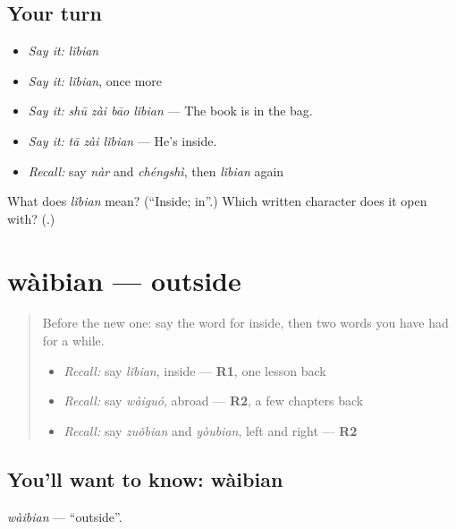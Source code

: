 \subsection*{Your turn}
\begin{itemize}
\raggedright
  \item \emph{Say it:} \emph{lǐbian}
  \item \emph{Say it:} \emph{lǐbian}, once more
  \item \emph{Say it:} \emph{shū zài bāo lǐbian} — The book is in the bag.
  \item \emph{Say it:} \emph{tā zài lǐbian} — He's inside.
  \item \emph{Recall:} say \emph{nàr} and \emph{chéngshì}, then \emph{lǐbian} again
\end{itemize}

\begin{tcolorbox}[breakable,colback=teal!4,colframe=teal!35!black,title={Before you move on}]
What does \emph{lǐbian} mean? (\textquotedblleft{}Inside; in\textquotedblright{}.) Which written character does it open with? (\textbf{}.)
\end{tcolorbox}
\section[wàibian]{wàibian — outside}

\label{lesson:ZH-C85-waibian}



\begin{quote}
Before the new one: say the word for inside, then two words you have had for a while.

\begin{itemize}
\raggedright
  \item \emph{Recall:} say \emph{lǐbian}, inside — \textbf{R1}, one lesson back
  \item \emph{Recall:} say \emph{wàiguó}, abroad — \textbf{R2}, a few chapters back
  \item \emph{Recall:} say \emph{zuǒbian} and \emph{yòubian}, left and right — \textbf{R2}
\end{itemize}
\end{quote}

\subsection*{You'll want to know: wàibian}
\emph{wàibian} — \textquotedblleft{}outside\textquotedblright{}.

